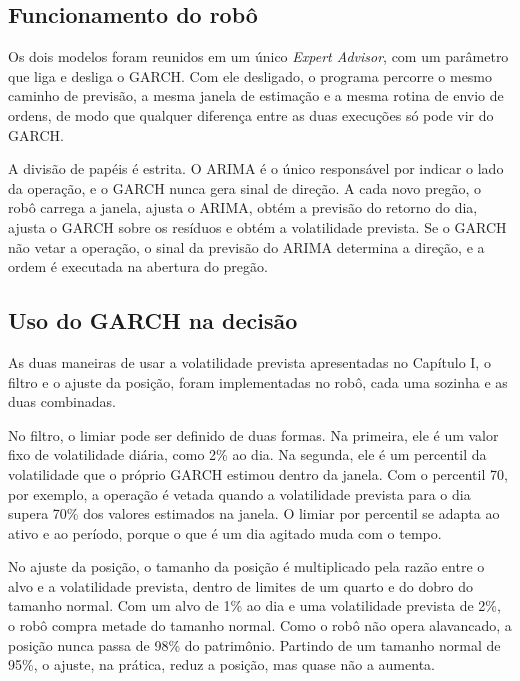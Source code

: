 \subsection{Funcionamento do robô}

Os dois modelos foram reunidos em um único \textit{Expert Advisor}, com um
parâmetro que liga e desliga o GARCH. Com ele desligado, o programa percorre o
mesmo caminho de previsão, a mesma janela de estimação e a mesma rotina de envio
de ordens, de modo que qualquer diferença entre as duas execuções só pode vir do
GARCH.

A divisão de papéis é estrita. O ARIMA é o único responsável por indicar o lado da
operação, e o GARCH nunca gera sinal de direção. A cada novo pregão, o robô
carrega a janela, ajusta o ARIMA, obtém a previsão do retorno do dia, ajusta o
GARCH sobre os resíduos e obtém a volatilidade prevista. Se o GARCH não vetar a
operação, o sinal da previsão do ARIMA determina a direção, e a ordem é executada
na abertura do pregão.

\subsection{Uso do GARCH na decisão}

As duas maneiras de usar a volatilidade prevista apresentadas no Capítulo I, o
filtro e o ajuste da posição, foram implementadas no robô, cada uma sozinha e as
duas combinadas.

No filtro, o limiar pode ser definido de duas formas. Na primeira, ele é um valor
fixo de volatilidade diária, como 2\% ao dia. Na segunda, ele é um percentil da
volatilidade que o próprio GARCH estimou dentro da janela. Com o percentil 70, por
exemplo, a operação é vetada quando a volatilidade prevista para o dia supera 70\%
dos valores estimados na janela. O limiar por percentil se adapta ao ativo e ao
período, porque o que é um dia agitado muda com o tempo.

No ajuste da posição, o tamanho da posição é multiplicado pela razão entre o alvo
e a volatilidade prevista, dentro de limites de um quarto e do dobro do tamanho
normal. Com um alvo de 1\% ao dia e uma volatilidade prevista de 2\%, o robô compra
metade do tamanho normal. Como o robô não opera alavancado, a posição nunca passa
de 98\% do patrimônio. Partindo de um tamanho normal de 95\%, o ajuste, na
prática, reduz a posição, mas quase não a aumenta.


